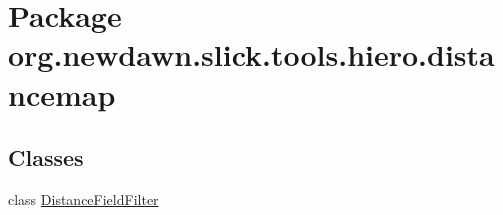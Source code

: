\hypertarget{namespaceorg_1_1newdawn_1_1slick_1_1tools_1_1hiero_1_1distancemap}{}\section{Package org.\+newdawn.\+slick.\+tools.\+hiero.\+distancemap}
\label{namespaceorg_1_1newdawn_1_1slick_1_1tools_1_1hiero_1_1distancemap}
\subsection*{Classes}
\begin{DoxyCompactItemize}
\item 
class \mbox{\hyperlink{classorg_1_1newdawn_1_1slick_1_1tools_1_1hiero_1_1distancemap_1_1_distance_field_filter}{Distance\+Field\+Filter}}
\end{DoxyCompactItemize}
